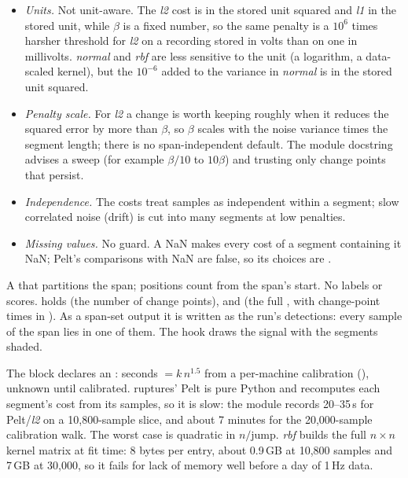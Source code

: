 \begin{itemize}
\item \emph{Units.} Not unit-aware. The \emph{l2} cost is in the stored unit squared and
  \emph{l1} in the stored unit, while $\beta$ is a fixed number, so the same penalty is a
  $10^6$ times harsher threshold for \emph{l2} on a recording stored in volts than on one
  in millivolts. \emph{normal} and \emph{rbf} are less sensitive to the unit (a logarithm,
  a data-scaled kernel), but the $10^{-6}$ added to the variance in \emph{normal} is in the
  stored unit squared.
\item \emph{Penalty scale.} For \emph{l2} a change is worth keeping roughly when it reduces
  the squared error by more than $\beta$, so $\beta$ scales with the noise variance times
  the segment length; there is no span-independent default. The module docstring advises a
  sweep (for example $\beta/10$ to $10\beta$) and trusting only change points that persist.
\item \emph{Independence.} The costs treat samples as independent within a segment; slow
  correlated noise (drift) is cut into many segments at low penalties.
\item \emph{Missing values.} No guard. A NaN makes every cost of a segment containing it
  NaN; Pelt's comparisons with NaN are false, so its choices are
  .
\end{itemize}

A  that partitions the span; positions count from the span's start. No labels
or scores.  holds  (the number of change points), 
and  (the full , with change-point times in
). As a span-set output it is written as the run's detections: every sample of
the span lies in one of them. The  hook draws the signal with the segments shaded.

The block declares an : seconds $= k\, n^{1.5}$ from a per-machine calibration
(), unknown until calibrated. ruptures' Pelt is pure Python and
recomputes each segment's cost from its samples, so it is slow: the module records 20--35\,s
for Pelt/\emph{l2} on a 10{,}800-sample slice, and 
about 7 minutes for the 20{,}000-sample calibration walk. The worst case is quadratic in
$n/\text{jump}$. \emph{rbf} builds the full $n\times n$ kernel matrix at fit time: 8 bytes
per entry, about 0.9\,GB at 10{,}800 samples and 7\,GB at 30{,}000, so it fails for lack of
memory well before a day of 1\,Hz data.

